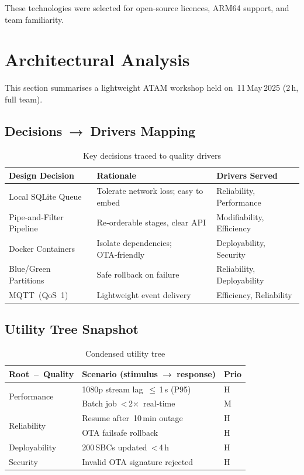 \documentclass[11pt,a4paper]{article}
\begin{document}
These technologies were selected for open‑source licences, ARM64 support, and team familiarity.

\section{Architectural Analysis}

This section summarises a lightweight ATAM workshop held on 11 May 2025 (2 h, full team).

\subsection{Decisions → Drivers Mapping}
\begin{table}[h!]
\centering
\setlength{\extrarowheight}{2pt}
\begin{tabular}{|p{3cm}|p{5.2cm}|p{3.6cm}|}
\hline
\textbf{Design Decision} & \textbf{Rationale} & \textbf{Drivers Served} \\ \hline
Local SQLite Queue & Tolerate network loss; easy to embed & Reliability, Performance \\ \hline
Pipe‑and‑Filter Pipeline & Re‑orderable stages, clear API & Modifiability, Efficiency \\ \hline
Docker Containers & Isolate dependencies; OTA‑friendly & Deployability, Security \\ \hline
Blue/Green Partitions & Safe rollback on failure & Reliability, Deployability \\ \hline
MQTT (QoS 1) & Lightweight event delivery & Efficiency, Reliability \\ \hline
\end{tabular}
\caption{Key decisions traced to quality drivers}
\label{tab:decision_driver}
\end{table}

\subsection{Utility Tree Snapshot}
\begin{table}[H]
\centering
\setlength{\extrarowheight}{2pt}
\begin{tabular}{|p{2.2cm}|p{4.6cm}|p{1.1cm}|}
\hline
\textbf{Root – Quality} & \textbf{Scenario (stimulus → response)} & \textbf{Prio} \\ \hline
\multirow{2}{*}{Performance} & 1080p stream lag $\le$ 1 s (P95) & H \\ \cline{2-3}
 & Batch job < 2× real‑time & M \\ \hline
\multirow{2}{*}{Reliability} & Resume after 10 min outage & H \\ \cline{2-3}
 & OTA failsafe rollback & H \\ \hline
Deployability & 200 SBCs updated < 4 h & H \\ \hline
Security & Invalid OTA signature rejected & H \\ \hline
\end{tabular}
\caption{Condensed utility tree}
\label{tab:utility_tree}
\end{table}
\end{document}
